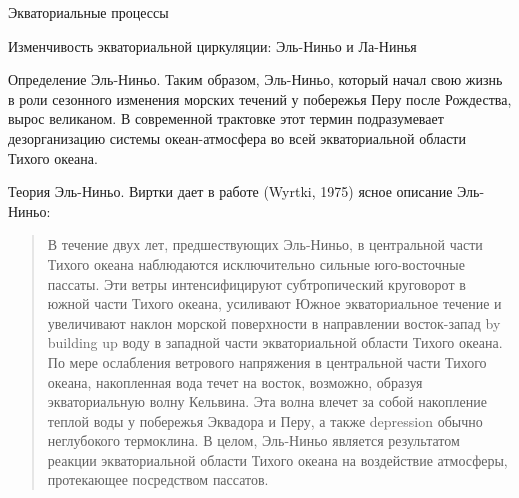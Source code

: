 \begin{chapter}{Экваториальные процессы}
\begin{section}{Изменчивость экваториальной циркуляции: Эль-Ниньо и Ла-Нинья}
\begin{paragraph}{Определение Эль-Ниньо.}
Таким образом, Эль-Ниньо, который начал свою жизнь в роли сезонного изменения
морских течений у побережья Перу после Рождества, вырос великаном.
В современной трактовке этот термин подразумевает дезорганизацию системы
океан-атмосфера во всей экваториальной области Тихого океана.
%
\end{paragraph}

\begin{paragraph}{Теория Эль-Ниньо.}
%
Виртки дает в работе (Wyrtki, 1975) ясное описание Эль-Ниньо:
%
%
\begin{quote}
В течение двух лет, предшествующих Эль-Ниньо, в центральной части Тихого
океана наблюдаются исключительно сильные юго-восточные пассаты. Эти ветры
интенсифицируют субтропический круговорот в южной части Тихого океана,
усиливают Южное экваториальное течение и увеличивают наклон морской поверхности
в направлении восток-запад by building up воду в западной части экваториальной
области Тихого океана. По мере ослабления ветрового напряжения%
 в центральной части Тихого океана,
накопленная вода течет на восток, возможно, образуя экваториальную волну
Кельвина. Эта волна влечет за собой накопление теплой
воды у побережья Эквадора и Перу, а также depression обычно неглубокого
термоклина. В целом, Эль-Ниньо является
результатом реакции экваториальной области Тихого океана на воздействие
атмосферы, протекающее посредством пассатов.
%
\end{quote}


\end{paragraph}
\end{section}
\end{chapter}
